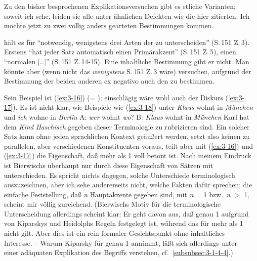 \documentclass[output=paper]{langsci/langscibook}
\begin{document}
Zu den bisher besprochenen Explikationsversuchen gibt es etliche
Varianten; soweit ich sehe, leiden sie alle unter ähnlichen Defekten
wie die hier zitierten. Ich möchte jetzt zu zwei völlig anders
gearteten Bestimmungen kommen.

\citet[151ff]{Bierwisch66} hält es für "`notwendig, wenigstens
drei Arten der  zu unterscheiden"' (S.\,151 Z.\,3). Erstens "`hat
jeder Satz automatisch einen Primärakzent"' (S.\,151 Z.\,5), einen "`normalen
 [\ldots{}]"' (S.\,151 Z.\,14-15). Eine inhaltliche Bestimmung gibt er
nicht. Man könnte aber (wenn nicht das \textit{wenigstens} S.\,151 Z.\,3 wäre) versuchen, aufgrund der Bestimmung der beiden anderen  ex negativo auch den  zu bestimmen.
\begin{exe}
	\settowidth{}
	 
\end{exe}
\addlines
Sein Beispiel ist (\ref{ex:3-16}) (= \citealt[151 (31c)]{Bierwisch66}); einschlägig wäre wohl auch der Diskurs (\ref{ex:3-17}). Es ist nicht klar, wie Beispiele wie (\ref{ex:3-18}) unter
\ea
\label{ex:3-16}
\textit{Klaus} wohnt in \textit{München} und \textit{ich} wohne in \textit{Berlin}
\z
\eal \label{ex:3-17}
\ex
\label{ex:3-17a}
A: \textit{wer} wohnt \textit{wo}?
\ex
\label{ex:3-17b}
B: \textit{Klaus} wohnt in \textit{München}
\zl
\ea
\label{ex:3-18}
Karl hat dem \textit{Kind} \textit{Haschisch} gegeben
\z
dieser Terminologie zu rubrizieren sind. Ein solcher Satz kann ohne jeden sprachlichen Kontext geäußert werden, setzt also keinen  zu parallelen, aber  verschiedenen Konstituenten voraus, teilt aber mit (\ref{ex:3-16}) und (\ref{ex:3-17}) die Eigenschaft, daß mehr als 1  voll betont ist. Nach meinem Eindruck ist
Bierwischs   überhaupt nur durch diese Eigenschaft von Sätzen mit  unterschieden. Es spricht nichts dagegen, solche Unterschiede
terminologisch auszuzeichnen, aber ich sehe andererseits nicht, welche Fakten dafür sprechen; die einfache Feststellung, daß \textit{n} Hauptakzente gegeben sind, mit \textit{n} = 1 bzw.\ \textit{n} $>$ 1, scheint mir völlig zureichend. (Bierwischs Motiv für die terminologische Unterscheidung
allerdings scheint klar: Er geht davon aus, daß genau 1  aufgrund von Kiparskys \citep{Kiparsky66} und Heidolphs \citep{Heidolph70} Regeln festgelegt ist, während das für mehr als 1  nicht gilt. Aber dies ist ein rein formaler Gesichtspunkt ohne inhaltliches Interesse. -- Warum Kiparsky für  genau 1  annimmt, läßt sich allerdings unter einer adäquaten Explikation des Begriffs verstehen, cf.\ \ref{subsubsec:3-1-4-4}.)
\end{document}
